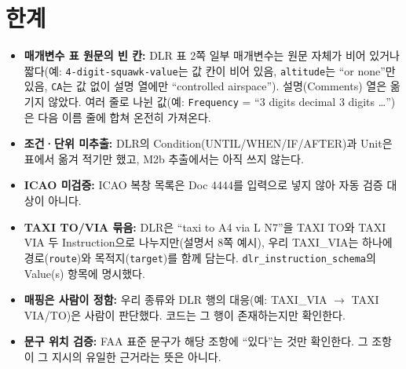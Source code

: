 \documentclass[10pt,a4paper]{article}
\newcommand{\cmd}[1]{\textsf{\small #1}}
\newcommand{\key}[1]{\texttt{\small #1}}
\begin{document}
\section{한계}
\begin{caveat}
\begin{itemize}[leftmargin=12pt]
\item \textbf{매개변수 표 원문의 빈 칸:} DLR 표 2쪽 일부 매개변수는 원문 자체가 비어 있거나 짧다(예: \texttt{4-digit-squawk-value}는 값 칸이 비어 있음, \texttt{altitude}는 ``or none''만 있음, \texttt{CA}는 값 없이 설명 열에만 ``controlled airspace''). 설명(Comments) 열은 옮기지 않았다. 여러 줄로 나뉜 값(예: \texttt{Frequency} = ``3 digits decimal 3 digits \ldots'')은 다음 이름 줄에 합쳐 온전히 가져온다.
\item \textbf{조건·단위 미추출:} DLR의 Condition(UNTIL/WHEN/IF/AFTER)과 Unit은 표에서 옮겨 적기만 했고, M2b 추출에서는 아직 쓰지 않는다.
\item \textbf{ICAO 미검증:} ICAO 복창 목록은 Doc 4444를 입력으로 넣지 않아 자동 검증 대상이 아니다.
\item \textbf{TAXI TO/VIA 묶음:} DLR은 ``taxi to A4 via L N7''을 TAXI TO와 TAXI VIA 두 Instruction으로 나누지만(설명서 8쪽 예시), 우리 \cmd{TAXI\_VIA}는 하나에 경로(\key{route})와 목적지(\key{target})를 함께 담는다. \key{dlr\_instruction\_schema}의 Value(s) 항목에 명시했다.
\item \textbf{매핑은 사람이 정함:} 우리 종류와 DLR 행의 대응(예: \cmd{TAXI\_VIA} $\to$ TAXI VIA/TO)은 사람이 판단했다. 코드는 그 행이 존재하는지만 확인한다.
\item \textbf{문구 위치 검증:} FAA 표준 문구가 해당 조항에 ``있다''는 것만 확인한다. 그 조항이 그 지시의 유일한 근거라는 뜻은 아니다.
\end{itemize}
\end{caveat}
\end{document}
